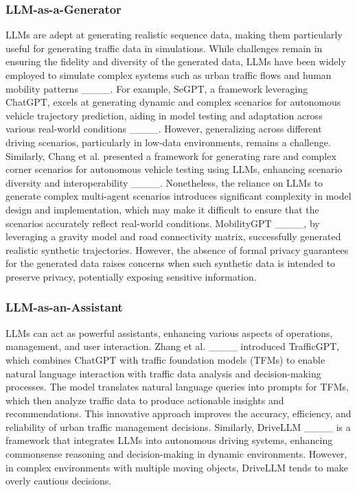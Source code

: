 \subsubsection{LLM-as-a-Generator}  
LLMs are adept at generating realistic sequence data, making them particularly useful for generating traffic data in simulations. While challenges remain in ensuring the fidelity and diversity of the generated data, LLMs have been widely employed to simulate complex systems such as urban traffic flows and human mobility patterns ____. For example, SeGPT, a framework leveraging ChatGPT, excels at generating dynamic and complex scenarios for autonomous vehicle trajectory prediction, aiding in model testing and adaptation across various real-world conditions ____. However, generalizing across different driving scenarios, particularly in low-data environments, remains a challenge. Similarly, Chang et al. presented a framework for generating rare and complex corner scenarios for autonomous vehicle testing using LLMs, enhancing scenario diversity and interoperability ____. Nonetheless, the reliance on LLMs to generate complex multi-agent scenarios introduces significant complexity in model design and implementation, which may make it difficult to ensure that the scenarios accurately reflect real-world conditions. MobilityGPT ____, by leveraging a gravity model and road connectivity matrix, successfully generated realistic synthetic trajectories. However, the absence of formal privacy guarantees for the generated data raises concerns when such synthetic data is intended to preserve privacy, potentially exposing sensitive information.

\subsubsection{LLM-as-an-Assistant}  
LLMs can act as powerful assistants, enhancing various aspects of operations, management, and user interaction. Zhang et al. ____ introduced TrafficGPT, which combines ChatGPT with traffic foundation models (TFMs) to enable natural language interaction with traffic data analysis and decision-making processes. The model translates natural language queries into prompts for TFMs, which then analyze traffic data to produce actionable insights and recommendations. This innovative approach improves the accuracy, efficiency, and reliability of urban traffic management decisions. Similarly, DriveLLM ____ is a framework that integrates LLMs into autonomous driving systems, enhancing commonsense reasoning and decision-making in dynamic environments. However, in complex environments with multiple moving objects, DriveLLM tends to make overly cautious decisions.

